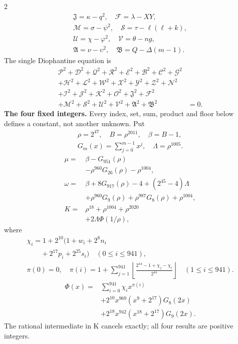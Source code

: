 \documentclass[10pt]{article}
\newcommand{\fl}[1]{\left\lfloor#1\right\rfloor}
\begin{document}
\begin{multicols}{2}
\[\begin{gathered}
\mathfrak{J}=\kappa-q^2,\quad\mathcal{F}=\lambda-XY,\\
\mathcal{M}=\sigma-\psi^2,\quad\mathcal{S}=\tau-\ell(\ell+k),\\
\mathcal{U}=\chi-\varphi^2,\quad\mathcal{V}=\theta-ng,\\
\mathfrak{A}=\nu-\upsilon^2,\quad\mathfrak{B}=Q-\Delta(m-1).
\end{gathered}
\]
The single Diophantine equation is
\[
\begin{split}
\mathcal{P}^2+\mathcal{D}^2+\mathcal{Q}^2+\mathcal{R}^2+\mathcal{E}^2+\mathcal{B}^2+\mathcal{C}^2+\mathcal{G}^2 &\\
+\mathcal{H}^2+\mathcal{L}^2+\mathcal{W}^2+\mathcal{X}^2+\mathcal{Y}^2+\mathcal{Z}^2+\mathcal{N}^2 &\\
+\mathcal{I}^2+\mathcal{J}^2+\mathcal{K}^2+\mathcal{O}^2+\mathfrak{J}^2+\mathcal{F}^2 &\\
+\mathcal{M}^2+\mathcal{S}^2+\mathcal{U}^2+\mathcal{V}^2+\mathfrak{A}^2+\mathfrak{B}^2 &= 0.
\end{split}
\]
\textbf{The four fixed integers.}
Every index, set, sum, product and floor below defines a constant, not
another unknown. Put
\[
\begin{gathered}
\rho=2^{47},\quad B=\rho^{2011},\quad\beta=B-1,\\
G_m(x)=\sum_{j=0}^{m-1}x^j,\quad
\Lambda=\rho^{1005}.
\end{gathered}
\]
\begin{align*}
\mu={}&\beta-G_{951}(\rho)\\
&-\rho^{960}G_{26}(\rho)-\rho^{1004},\\
\omega={}&\beta+8G_{917}(\rho)-4+(2^{45}-4)\Lambda\\
&+\rho^{960}G_9(\rho)+\rho^{987}G_8(\rho)
  +\rho^{1004},\\
K={}&\rho^{18}+\rho^{1004}+\rho^{2020}\\
&+2\Lambda\Phi(1/\rho),
\end{align*}
where
\[
\begin{gathered}
\chi_i=1+2^{10}(1+w_i+2^8n_i\\
\qquad+2^{17}p_i+2^{25}s_i)\quad(0\le i\le941),\\
\pi(0)=0,\quad\pi(i)=1+\sum_{j=1}^{941}
\fl{\frac{2^{44}-1+\chi_j-\chi_i}{2^{44}}}\quad(1\le i\le941).
\end{gathered}
\]
\[
\begin{split}
\Phi(x)={}&\sum_{i=0}^{941}\chi_i x^{\pi(i)}\\
&+2^{10}x^{969}(x^9+2^{17})G_8(2x)\\
&+2^{18}x^{942}(x^{18}+2^{17})G_9(2x).
\end{split}
\]
The rational intermediate in K cancels exactly; all four results are positive integers.


\end{multicols}
\end{document}
